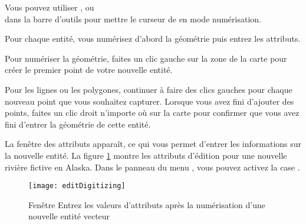 Vous pouvez utiliser ,  ou\\  dans la barre d'outils pour mettre le curseur de \qg en mode numérisation.

Pour chaque entité, vous numérisez d'abord la géométrie puis entrez les attributs.

Pour numériser la géométrie, faites un clic gauche sur la zone de la carte pour créer le premier point de votre nouvelle entité.

Pour les lignes ou les polygones, continuer à faire des clics gauches pour chaque nouveau point que vous souhaitez capturer. Lorsque vous avez fini d'ajouter des points, faites un clic droit n'importe où sur la carte pour confirmer que vous avez fini d'entrer la géométrie de cette entité.

La fenêtre des attributs apparaît, ce qui vous permet d'entrer les informations sur la nouvelle entité. La figure \ref{fig:vector_digitising} montre les attributs d'édition pour une nouvelle rivière fictive en Alaska. Dans le panneau  du menu  \arrow {}, vous pouvez activez la case .

\begin{figure}[ht]
  \begin{center}
   \texttt{[image: editDigitizing]}
  \caption{Fenêtre Entrez les valeurs d'attributs après la numérisation d'une nouvelle entité vecteur \nixcaption}\label{fig:vector_digitising}
\end{center}
\end{figure}

